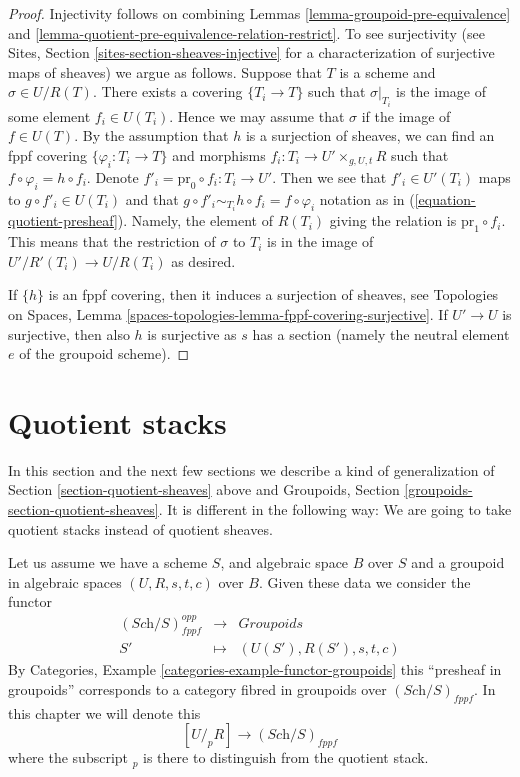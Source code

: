 \begin{proof}
Injectivity follows on combining
Lemmas \ref{lemma-groupoid-pre-equivalence} and
\ref{lemma-quotient-pre-equivalence-relation-restrict}.
To see surjectivity (see
Sites, Section \ref{sites-section-sheaves-injective}
for a characterization of surjective maps of sheaves) we argue as follows.
Suppose that $T$ is a scheme and $\sigma \in U/R(T)$.
There exists a covering $\{T_i \to T\}$ such that $\sigma|_{T_i}$
is the image of some element $f_i \in U(T_i)$. Hence we
may assume that $\sigma$ if the image of $f \in U(T)$.
By the assumption that $h$ is a surjection of sheaves, we
can find an fppf covering $\{\varphi_i : T_i \to T\}$ and morphisms
$f_i : T_i \to U' \times_{g, U, t} R$ such that
$f \circ \varphi_i = h \circ f_i$. Denote
$f'_i = \text{pr}_0 \circ f_i : T_i \to U'$. Then we see that
$f'_i \in U'(T_i)$ maps to $g \circ f'_i \in U(T_i)$ and
that $g \circ f'_i \sim_{T_i} h \circ f_i = f \circ \varphi_i$
notation as in (\ref{equation-quotient-presheaf}). Namely, the
element of $R(T_i)$ giving the relation is $\text{pr}_1 \circ f_i$.
This means that the restriction
of $\sigma$ to $T_i$ is in the image of $U'/R'(T_i) \to U/R(T_i)$
as desired.

\medskip\noindent
If $\{h\}$ is an fppf covering, then it induces a surjection of sheaves, see
Topologies on Spaces,
Lemma \ref{spaces-topologies-lemma-fppf-covering-surjective}.
If $U' \to U$ is surjective, then also $h$ is surjective as $s$ has a section
(namely the neutral element $e$ of the groupoid scheme).
\end{proof}





\section{Quotient stacks}
\label{section-stacks}

\noindent
In this section and the next few sections we describe a kind of
generalization of
Section \ref{section-quotient-sheaves}
above and
Groupoids, Section \ref{groupoids-section-quotient-sheaves}.
It is different in the following way:
We are going to take quotient stacks instead of quotient sheaves.

\medskip\noindent
Let us assume we have a scheme $S$, and algebraic space $B$ over $S$
and a groupoid in algebraic spaces $(U, R, s, t, c)$ over $B$. Given these data
we consider the functor
\begin{equation}
\label{equation-quotient-stack}
\begin{matrix}
(\textit{Sch}/S)_{fppf}^{opp} &
\longrightarrow &
\textit{Groupoids} \\
S' &
\longmapsto &
(U(S'), R(S'), s, t, c)
\end{matrix}
\end{equation}
By
Categories, Example \ref{categories-example-functor-groupoids}
this ``presheaf in groupoids'' corresponds to a category fibred in groupoids
over $(\textit{Sch}/S)_{fppf}$. In this chapter we will denote
this
$$
[U/_{\!p}R] \to (\textit{Sch}/S)_{fppf}
$$
where the subscript ${}_p$ is there to distinguish from the quotient stack.

